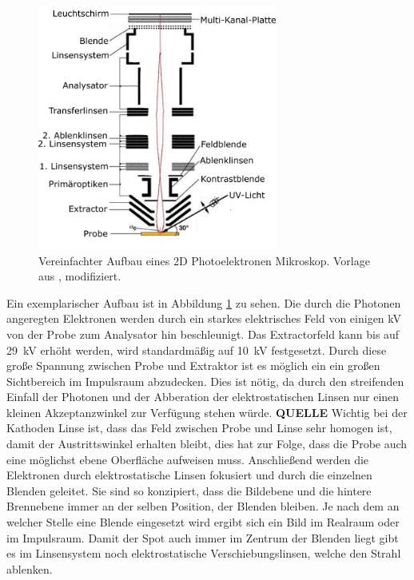        \begin{figure}
            \centering
            \includegraphics[width=0.7\textwidth]{./content/PEEM_schemaneu.png}
            \caption{Vereinfachter Aufbau eines 2D Photoelektronen Mikroskop. Vorlage aus \cite{KUCH}, modifiziert.}
            \label{fig:MM}
        \end{figure}
        Ein exemplarischer Aufbau ist in Abbildung \ref{fig:MM} zu sehen.
        Die durch die Photonen angeregten Elektronen werden durch ein starkes elektrisches Feld von einigen \si{\kilo\volt} von der Probe zum Analysator hin beschleunigt.
        Das Extractorfeld kann bis auf \SI{29}{\kilo\volt} erhöht werden, wird standardmäßig auf \SI{10}{\kilo\volt} festgesetzt.
        Durch diese große Spannung zwischen Probe und Extraktor ist es möglich ein ein großen Sichtbereich im Impulsraum abzudecken.
        Dies ist nötig, da durch den streifenden Einfall der Photonen und der Abberation der elektrostatischen Linsen nur einen kleinen Akzeptanzwinkel zur Verfügung stehen würde. \textbf{QUELLE}
        Wichtig bei der Kathoden Linse ist, dass das Feld zwischen Probe und Linse sehr homogen ist, damit der Austrittswinkel erhalten bleibt, dies hat zur Folge, dass die Probe auch eine möglichst ebene Oberfläche aufweisen muss.
        Anschließend werden die Elektronen durch elektrostatische Linsen fokusiert und durch die einzelnen Blenden geleitet.
        Sie sind so konzipiert, dass die Bildebene und die hintere Brennebene immer an der selben Position, der Blenden bleiben.
        Je nach dem an welcher Stelle eine Blende eingesetzt wird ergibt sich ein Bild im Realraum oder im Impulsraum.
        Damit der Spot auch immer im Zentrum der Blenden liegt gibt es im Linsensystem noch elektrostatische Verschiebungslinsen, welche den Strahl ablenken.
